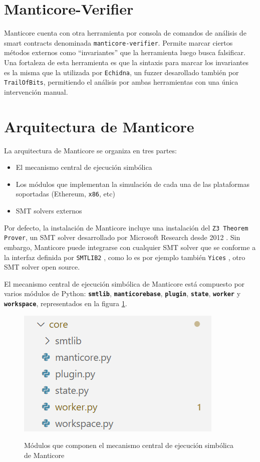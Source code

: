 \section{Manticore-Verifier}
Manticore cuenta con otra herramienta por consola de comandos de análisis de smart contracts denominada \texttt{manticore-verifier}.
Permite marcar ciertos métodos externos como ``invariantes'' que la herramienta luego busca falsificar.
Una fortaleza de esta herramienta es que la sintaxis para marcar los invariantes es la misma que la utilizada por \texttt{Echidna}, un fuzzer desarollado también por \texttt{TrailOfBits}, permitiendo el análisis por ambas herramientas con una única intervención manual.

\section{Arquitectura de Manticore}
La arquitectura de Manticore se organiza en tres partes:
\begin{itemize}
    \item El mecanismo central de ejecución simbólica
    \item Los módulos que implementan la simulación de cada una de las plataformas soportadas (Ethereum, \texttt{x86}, etc)
    \item SMT solvers externos
\end{itemize}

Por defecto, la instalación de Manticore incluye una instalación del \texttt{Z3 Theorem Prover}, un SMT solver desarrollado por Microsoft Research desde 2012 \cite{z3TheoremProver}.
Sin embargo, Manticore puede integrarse con cualquier SMT solver que se conforme a la interfaz definida por \texttt{SMTLIB2} \cite{smtlib2}, como lo es por ejemplo también \texttt{Yices} \cite{yices}, otro SMT solver open source.

El mecanismo central de ejecución simbólica de Manticore está compuesto por varios módulos de Python: \texttt{\textbf{smtlib}}, \texttt{\textbf{manticorebase}}, \texttt{\textbf{plugin}}, \texttt{\textbf{state}}, \texttt{\textbf{worker}} y \texttt{\textbf{workspace}}, representados en la figura \ref{fig:core-modules}.

\begin{figure}
    \centering
    {\includegraphics {figs/core-architecture-manticore.png}}
    \caption{Módulos que componen el mecanismo central de ejecución simbólica de Manticore}
    \label{fig:core-modules}
\end{figure}

